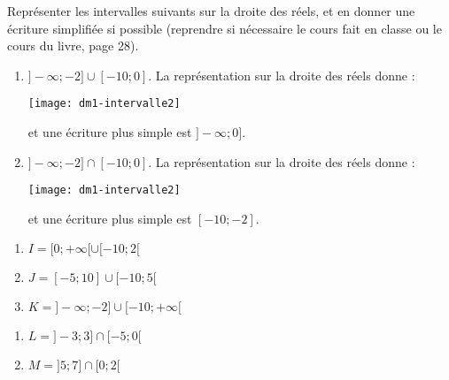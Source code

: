 \documentclass[12pt]{article}
\begin{document}
  \begin{exercice} Représenter les intervalles suivants sur la droite des réels, et en donner une écriture simplifiée si possible (reprendre si nécessaire le cours fait en classe ou le cours du livre, page 28).
    \begin{framed}
    \begin{enumerate}[Exemple 1 :]
      \item $]-\infty; -2]\cup[-10;0]$. La représentation sur la droite des réels donne :

        \begin{center}
          \texttt{[image: dm1-intervalle2]}
        \end{center}

        et une écriture plus simple est $]-\infty; 0]$.

      \item $]-\infty; -2]\cap[-10;0]$. La représentation sur la droite des réels donne :
        \begin{center}
          \texttt{[image: dm1-intervalle2]}
        \end{center}
        et une écriture plus simple est $[-10; -2]$.
    \end{enumerate}
  \end{framed}

    \begin{multicols}{2}
    \begin{enumerate}[]
      \item $I = [0; +\infty[\cup[-10; 2[$
      \item $J = [-5; 10]\cup[-10; 5[$
      \item $K = ]-\infty; -2]\cup[-10; +\infty[$
    \end{enumerate}
    \columnbreak
    \begin{enumerate}[]
      \item $L = ]-3; 3]\cap[-5; 0[$
      \item $M = ]5; 7]\cap[0; 2[$
    \end{enumerate}
  \end{multicols}
  \end{exercice}
\end{document}

